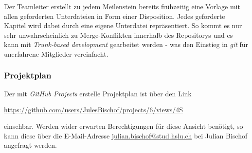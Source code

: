 \documentclass[main.tex]{subfiles} %
\begin{document}
Der Teamleiter erstellt zu jedem Meilenstein bereits frühzeitig eine Vorlage
mit allen geforderten Unterdateien in Form einer Disposition. Jedes geforderte
Kapitel wird dabei durch eine eigene Unterdatei repräsentiert. So kommt es nur
sehr unwahrscheinlich zu Merge-Konflikten innerhalb des Repositorys und es kann
mit \textit{Trunk-based development} gearbeitet werden - was den Einstieg in
\textit{git} für unerfahrene Mitglieder vereinfacht.

\subsubsection*{Projektplan}
Der mit \textit{GitHub Projects} erstelle Projektplan ist über den Link

\href{https://github.com/users/JulesBischof/projects/6/views/4}{https://github.com/users/JulesBischof/projects/6/views/4S}

einsehbar. Werden wider erwarten Berechtigungen für diese Ansicht benötigt, so
kann diese über die E-Mail-Adresse
\href{julian.bischof@stud.hslu.ch}{julian.bischof@stud.hslu.ch} bei Julian Bischof angefragt
werden.
\end{document}
